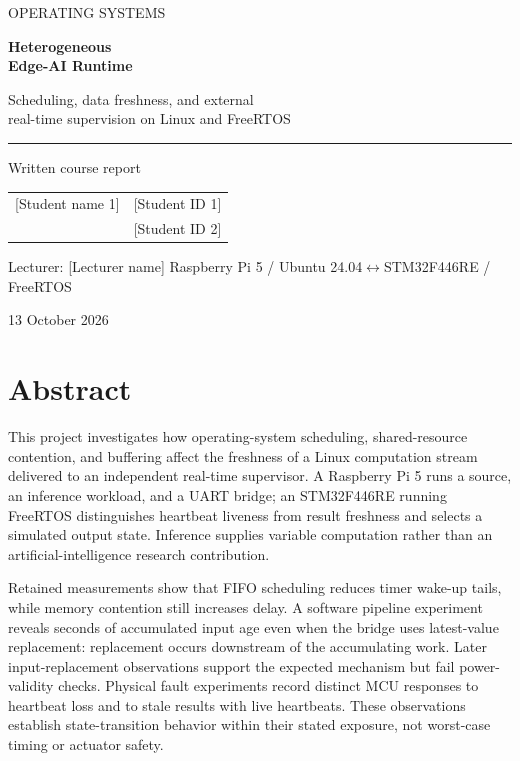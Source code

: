\documentclass[a4paper,11pt]{article}
\newcommand{\TeamMemberOne}{[Student name 1]}
\newcommand{\StudentIDOne}{[Student ID 1]}
\newcommand{\TeamMemberTwo}{[Student name 2]}
\newcommand{\StudentIDTwo}{[Student ID 2]}
\newcommand{\Lecturer}{[Lecturer name]}
\begin{document}
\hypersetup{pageanchor=false}
\begin{titlepage}
\centering
\vspace*{23mm}
{\large\color{teal}OPERATING SYSTEMS\par}
\vspace{15mm}
{\Huge\bfseries\color{navy}Heterogeneous\\[5pt]Edge-AI Runtime\par}
\vspace{8mm}
{\Large Scheduling, data freshness, and external\\real-time supervision on Linux and FreeRTOS\par}
\vspace{15mm}
\rule{0.65\textwidth}{0.6pt}\par
\vspace{12mm}
{\large Written course report\par}
\vspace{12mm}
\begin{tabular}{ll}\TeamMemberOne & \StudentIDOne\\\TeamMemberTwo & \StudentIDTwo\end{tabular}
\vspace{10mm}

Lecturer: \Lecturer
\vfill
Raspberry Pi 5 / Ubuntu 24.04\quad$\leftrightarrow$\quad STM32F446RE / FreeRTOS

13 October 2026
\vspace{8mm}
\end{titlepage}
\hypersetup{pageanchor=true}
\section*{Abstract}
This project investigates how operating-system scheduling, shared-resource contention, and buffering affect the freshness of a Linux computation stream delivered to an independent real-time supervisor. A Raspberry Pi 5 runs a source, an inference workload, and a UART bridge; an STM32F446RE running FreeRTOS distinguishes heartbeat liveness from result freshness and selects a simulated output state. Inference supplies variable computation rather than an artificial-intelligence research contribution.

Retained measurements show that FIFO scheduling reduces timer wake-up tails, while memory contention still increases delay. A software pipeline experiment reveals seconds of accumulated input age even when the bridge uses latest-value replacement: replacement occurs downstream of the accumulating work. Later input-replacement observations support the expected mechanism but fail power-validity checks. Physical fault experiments record distinct MCU responses to heartbeat loss and to stale results with live heartbeats. These observations establish state-transition behavior within their stated exposure, not worst-case timing or actuator safety.
\end{document}
